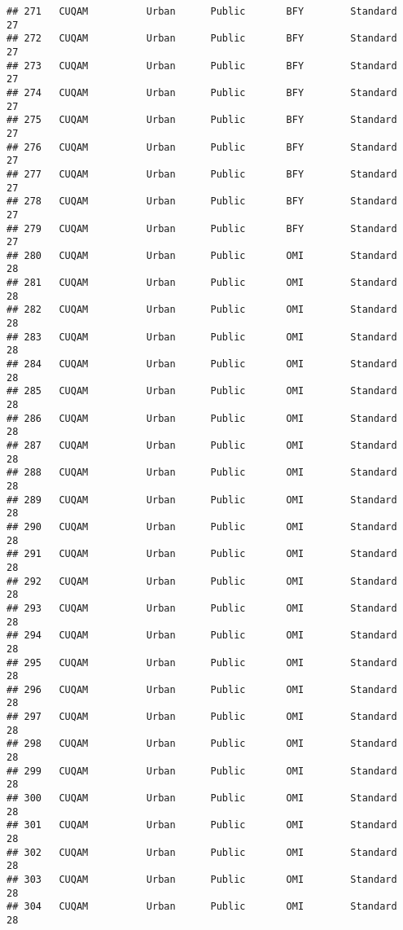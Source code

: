 \documentclass[
]{article}
\begin{document}
\begin{verbatim}
## 271   CUQAM          Urban      Public       BFY        Standard        27
## 272   CUQAM          Urban      Public       BFY        Standard        27
## 273   CUQAM          Urban      Public       BFY        Standard        27
## 274   CUQAM          Urban      Public       BFY        Standard        27
## 275   CUQAM          Urban      Public       BFY        Standard        27
## 276   CUQAM          Urban      Public       BFY        Standard        27
## 277   CUQAM          Urban      Public       BFY        Standard        27
## 278   CUQAM          Urban      Public       BFY        Standard        27
## 279   CUQAM          Urban      Public       BFY        Standard        27
## 280   CUQAM          Urban      Public       OMI        Standard        28
## 281   CUQAM          Urban      Public       OMI        Standard        28
## 282   CUQAM          Urban      Public       OMI        Standard        28
## 283   CUQAM          Urban      Public       OMI        Standard        28
## 284   CUQAM          Urban      Public       OMI        Standard        28
## 285   CUQAM          Urban      Public       OMI        Standard        28
## 286   CUQAM          Urban      Public       OMI        Standard        28
## 287   CUQAM          Urban      Public       OMI        Standard        28
## 288   CUQAM          Urban      Public       OMI        Standard        28
## 289   CUQAM          Urban      Public       OMI        Standard        28
## 290   CUQAM          Urban      Public       OMI        Standard        28
## 291   CUQAM          Urban      Public       OMI        Standard        28
## 292   CUQAM          Urban      Public       OMI        Standard        28
## 293   CUQAM          Urban      Public       OMI        Standard        28
## 294   CUQAM          Urban      Public       OMI        Standard        28
## 295   CUQAM          Urban      Public       OMI        Standard        28
## 296   CUQAM          Urban      Public       OMI        Standard        28
## 297   CUQAM          Urban      Public       OMI        Standard        28
## 298   CUQAM          Urban      Public       OMI        Standard        28
## 299   CUQAM          Urban      Public       OMI        Standard        28
## 300   CUQAM          Urban      Public       OMI        Standard        28
## 301   CUQAM          Urban      Public       OMI        Standard        28
## 302   CUQAM          Urban      Public       OMI        Standard        28
## 303   CUQAM          Urban      Public       OMI        Standard        28
## 304   CUQAM          Urban      Public       OMI        Standard        28

\end{verbatim}
\end{document}
